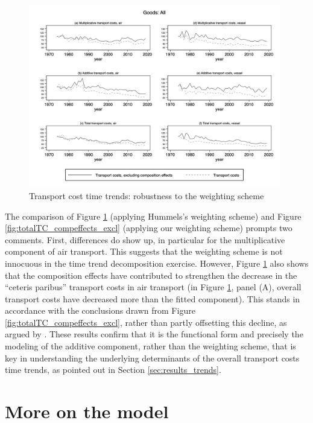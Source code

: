 \documentclass[a4paper,11pt]{article}
\begin{document}
\begin{figure}[htbp]
\caption{Transport cost time trends: robustness to the weighting scheme}
\label{fig:compeffects_robustness}
\begin{center}
\includegraphics[height=8cm]
{graph_composition_all_np.jpg}
\end{center}
\end{figure}

The comparison of Figure \ref{fig:compeffects_robustness} (applying Hummels's weighting scheme) and Figure \ref{fig:totalTC_compeffects_excl} (applying our weighting scheme) prompts two comments.
First, differences do show up, in particular for the multiplicative component of air transport.
This suggests that the weighting scheme is not innocuous in the time trend decomposition exercise.
However, Figure \ref{fig:compeffects_robustness} also shows that the composition effects have contributed to strengthen the decrease in the ``ceteris paribus'' transport costs in air transport (in Figure \ref{fig:compeffects_robustness}, panel (A), overall transport costs have decreased more than the fitted component). This stands in accordance with the conclusions drawn from Figure \ref{fig:totalTC_compeffects_excl}, rather than partly offsetting this decline, as argued by \cite{hummels2007}. These results confirm that it is the functional form and precisely the modeling of the additive component, rather than the weighting scheme, that is key in understanding the underlying determinants of the overall transport costs time trends, as pointed out in Section \ref{sec:results_trends}.


\section{More on the model \label{app:theoretical_model}}
\end{document}
